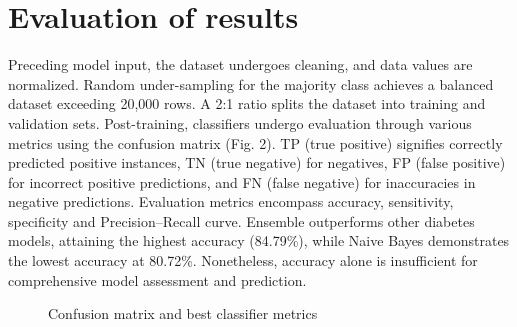 \documentclass[11pt]{article}
\begin{document}
\section{Evaluation of results}

Preceding model input, the dataset undergoes cleaning, and data values are normalized.  Random under-sampling for the majority class achieves a balanced dataset exceeding 20,000 rows. A 2:1 ratio splits the dataset into training and validation sets. Post-training, classifiers undergo evaluation through various metrics using the confusion matrix (Fig. 2). TP (true positive) signifies correctly predicted positive instances, TN (true negative) for negatives, FP (false positive) for incorrect positive predictions, and FN (false negative) for inaccuracies in negative predictions. Evaluation metrics encompass accuracy, sensitivity, specificity and Precision–Recall curve. Ensemble outperforms other diabetes models, attaining the highest accuracy (84.79\%), while Naive Bayes  demonstrates the lowest accuracy at 80.72\%. Nonetheless, accuracy alone is insufficient for comprehensive model assessment and prediction.


\begin{figure}[h]
\begin{center}
\end{center}
\caption{Confusion matrix and best classifier metrics}
\label{experiment1fitness}
\end{figure}
\end{document}
